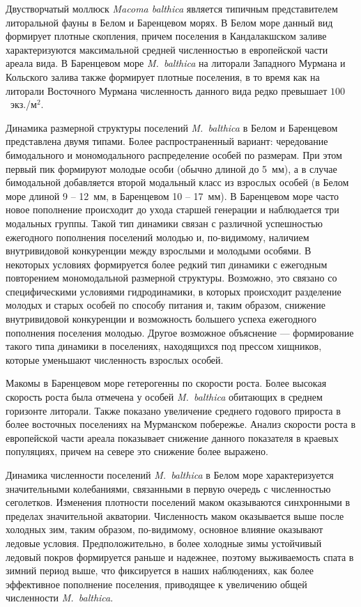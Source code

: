 Двустворчатый моллюск \textit{Macoma balthica} является типичным представителем литоральной фауны в Белом и Баренцевом морях. 
В Белом море данный вид формирует плотные скопления, причем поселения в Кандалакшском заливе характеризуются максимальной средней численностью в европейской части ареала вида.
В Баренцевом море \textit{M.~balthica} на литорали Западного Мурмана и Кольского залива также формирует плотные поселения, в то время как на литорали Восточного Мурмана численность данного вида редко превышает $100$~экз./м$^2$.

Динамика размерной структуры поселений {\it M.~balthica} в Белом и Баренцевом представлена двумя типами.
Более распространенный вариант: чередование бимодального и мономодального распределение особей по размерам. 
При этом первый пик формируют молодые особи (обычно длиной до 5~мм), а в случае бимодальной добавляется второй модальный класс из взрослых особей (в Белом море длиной 9 -- 12~мм, в Баренцевом 10 -- 17~мм). 
В Баренцевом море часто новое пополнение происходит до ухода старшей генерации и наблюдается три модальных группы. 
Такой тип динамики связан с различной успешностью ежегодного пополнения поселений молодью и, по-видимому, наличием внутривидовой конкуренции между взрослыми и молодыми особями.
В некоторых условиях формируется более редкий тип динамики с ежегодным повторением мономодальной размерной структуры. 
Возможно, это связано со специфическими условиями гидродинамики, в которых происходит разделение молодых и старых особей по способу питания и, таким образом, снижение внутривидовой конкуренции и возможность большего успеха ежегодного пополнения поселения молодью. 
Другое возможное объяснение --- формирование такого типа динамики в поселениях, находящихся под прессом хищников, которые уменьшают численность взрослых особей.

Макомы в Баренцевом море гетерогенны по скорости роста. 
Более высокая скорость роста была отмечена у особей {\it M.~balthica} обитающих в среднем горизонте литорали.
Также показано увеличение среднего годового прироста в более восточных поселениях на Мурманском побережье.
Анализ скорости роста в европейской части ареала показывает снижение данного показателя в краевых популяциях, причем на севере это снижение более выражено.

Динамика численности поселений {\it M.~balthica} в Белом море характеризуется значительными колебаниями, связанными в первую очередь с численностью сеголетков. Изменения плотности поселений маком оказываются синхронными в пределах значительной акватории.
Численность маком оказывается выше после холодных зим, таким образом, по-видимому, основное влияние оказывают ледовые условия.
Предположительно, в более холодные зимы устойчивый ледовый покров формируется раньше и надежнее, поэтому выживаемость спата в зимний период выше, что фиксируется в наших наблюдениях, как более эффективное пополнение поселения, приводящее к увеличению общей численности {\it M.~balthica}.

